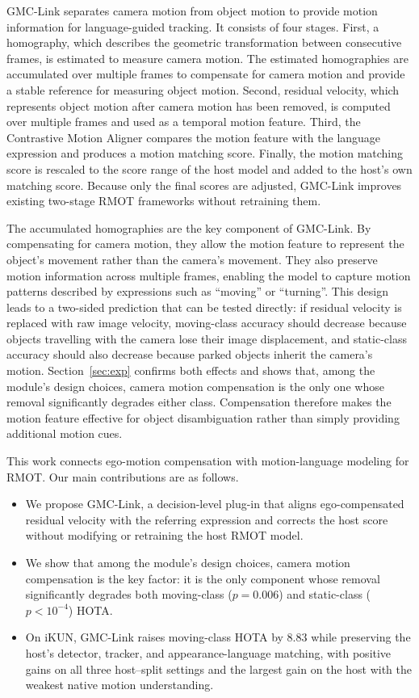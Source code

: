 \documentclass[sigconf,anonymous,nonacm]{acmart}
\begin{document}
GMC-Link separates camera motion from object motion to provide motion information for language-guided tracking. It consists of four stages. First, a homography, which describes the geometric transformation between consecutive frames, is estimated to measure camera motion. The estimated homographies are accumulated over multiple frames to compensate for camera motion and provide a stable reference for measuring object motion. Second, residual velocity, which represents object motion after camera motion has been removed, is computed over multiple frames and used as a temporal motion feature. Third, the Contrastive Motion Aligner compares the motion feature with the language expression and produces a motion matching score. Finally, the motion matching score is rescaled to the score range of the host model and added to the host's own matching score. Because only the final scores are adjusted, GMC-Link improves existing two-stage RMOT frameworks without retraining them.

The accumulated homographies are the key component of GMC-Link. By compensating for camera motion, they allow the motion feature to represent the object's movement rather than the camera's movement. They also preserve motion information across multiple frames, enabling the model to capture motion patterns described by expressions such as ``moving'' or ``turning''. This design leads to a two-sided prediction that can be tested directly: if residual velocity is replaced with raw image velocity, moving-class accuracy should decrease because objects travelling with the camera lose their image displacement, and static-class accuracy should also decrease because parked objects inherit the camera's motion. Section~\ref{sec:exp} confirms both effects and shows that, among the module's design choices, camera motion compensation is the only one whose removal significantly degrades either class. Compensation therefore makes the motion feature effective for object disambiguation rather than simply providing additional motion cues.

This work connects ego-motion compensation with motion-language modeling for RMOT. Our main contributions are as follows.
\begin{itemize}
  \item We propose GMC-Link, a decision-level plug-in that aligns ego-compensated residual velocity with the referring expression and corrects the host score without modifying or retraining the host RMOT model.
  \item We show that among the module's design choices, camera motion compensation is the key factor: it is the only component whose removal significantly degrades both moving-class ($p{=}0.006$) and static-class ($p{<}10^{-4}$) HOTA.
  \item On iKUN, GMC-Link raises moving-class HOTA by $8.83$ while preserving the host's detector, tracker, and appearance-language matching, with positive gains on all three host--split settings and the largest gain on the host with the weakest native motion understanding.
\end{itemize}
\end{document}
